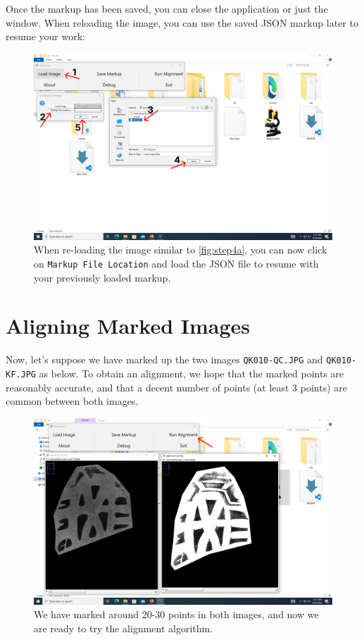 \documentclass[a4paper, oneside]{memoir}
\begin{document}
Once the markup has been saved, you can close the application or just the window. When
reloading the image, you can use the saved JSON markup later to resume your work:

\begin{figure}[H]
\begin{center}
	\includegraphics[width=0.8\linewidth]{images/step_5b-anno.png}
\end{center}
\caption{When re-loading the image similar to \autoref{fig:step4a}, you can now click on \texttt{Markup File Location} and load the JSON file to resume with your previously loaded markup.}
\label{fig:step5b}
\end{figure}

\section{Aligning Marked Images}%

Now, let's suppose we have marked up the two images \texttt{QK010-QC.JPG} and
\texttt{QK010-KF.JPG} as below. To obtain an alignment, we hope that the marked points are
reasonably accurate, and that a decent number of points (at least 3 points) are common
between both images.

\begin{figure}[H]
\begin{center}
	\includegraphics[width=0.8\linewidth]{images/step_6-anno.png}
\end{center}
\caption{We have marked around 20-30 points in both images, and now we are ready to try the alignment algorithm.}
\label{fig:step6}
\end{figure}
\end{document}
